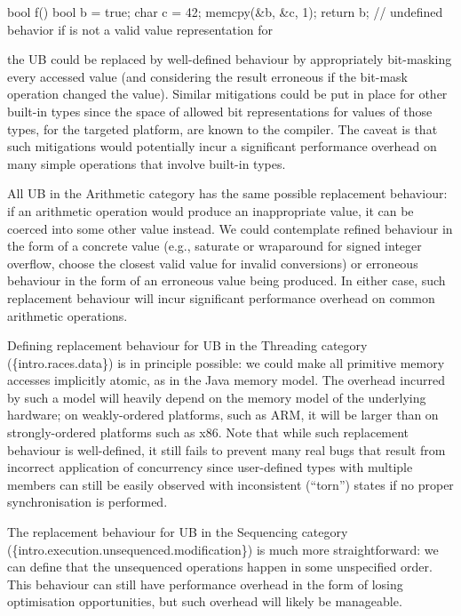 {\begin{codeblock}
bool f() {
  bool b = true;
  char c = 42;
  memcpy(&b, &c, 1);
  return b;         // undefined behavior if  is not a valid value representation for 
}
\end{codeblock}



the UB could be replaced by well-defined behaviour by appropriately bit-masking every accessed  value (and considering the result erroneous if the bit-mask operation changed the value). Similar mitigations could be put in place for other built-in types since the space of allowed bit representations for values of those types, for the targeted platform, are known to the compiler. The caveat is that such mitigations would potentially incur a significant performance overhead on many simple operations that involve built-in types.

All UB in the Arithmetic category has the same possible replacement behaviour: if an arithmetic operation would produce an inappropriate value, it can be coerced into some other value instead. We could contemplate refined behaviour in the form of a concrete value (e.g., saturate or wraparound for signed integer overflow, choose the closest valid value for invalid conversions) or erroneous behaviour in the form of an erroneous value being produced. In either case, such replacement behaviour will incur significant performance overhead on common arithmetic operations.

Defining replacement behaviour for UB in the Threading category (\{intro.races.data\}) is in principle possible: we could make all primitive memory accesses implicitly atomic, as in the Java memory model. The overhead incurred by such a model will heavily depend on the memory model of the underlying hardware; on weakly-ordered platforms, such as ARM,
it will be larger than on strongly-ordered platforms such as x86. Note that while such replacement behaviour is well-defined, it still fails to prevent many real bugs that result from incorrect application of concurrency since user-defined types with multiple members can still be easily observed with inconsistent (``torn'') states if no proper synchronisation is performed.


The replacement behaviour for UB in the Sequencing category (\{intro.execution.unsequenced.modifica\-tion\}) is much more straightforward: we can define that the unsequenced operations happen in some unspecified order. This behaviour can still have performance overhead in the form of losing  optimisation opportunities, but such overhead will likely be manageable. 


}
